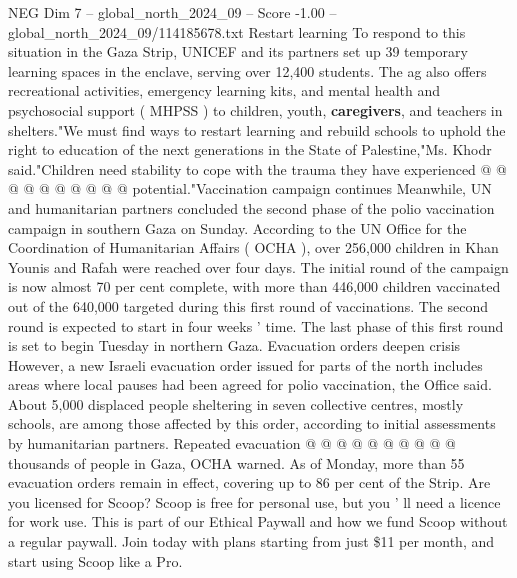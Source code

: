 \begin{textsample}{NEG Dim 7 – global\_north\_2024\_09 – Score -1.00 – global\_north\_2024\_09/114185678.txt}
Restart learning To respond to this situation in the Gaza Strip, UNICEF and its partners set up 39 temporary learning spaces in the enclave, serving over 12,400 students.
The ag also offers recreational activities, emergency learning kits, and mental health and psychosocial support ( MHPSS ) to children, youth, \textbf{caregivers}, and teachers in shelters."We must find ways to restart learning and rebuild schools to uphold the right to education of the next generations in the State of Palestine,"Ms.
Khodr said."Children need stability to cope with the trauma they have experienced @ @ @ @ @ @ @ @ @ @ potential."Vaccination campaign continues Meanwhile, UN and humanitarian partners concluded the second phase of the polio vaccination campaign in southern Gaza on Sunday.
According to the UN Office for the Coordination of Humanitarian Affairs ( OCHA ), over 256,000 children in Khan Younis and Rafah were reached over four days.
The initial round of the campaign is now almost 70 per cent complete, with more than 446,000 children vaccinated out of the 640,000 targeted during this first round of vaccinations.
The second round is expected to start in four weeks ' time.
The last phase of this first round is set to begin Tuesday in northern Gaza.
Evacuation orders deepen crisis However, a new Israeli evacuation order issued for parts of the north includes areas where local pauses had been agreed for polio vaccination, the Office said.
About 5,000 displaced people sheltering in seven collective centres, mostly schools, are among those affected by this order, according to initial assessments by humanitarian partners.
Repeated evacuation @ @ @ @ @ @ @ @ @ @ thousands of people in Gaza, OCHA warned.
As of Monday, more than 55 evacuation orders remain in effect, covering up to 86 per cent of the Strip.
Are you licensed for Scoop?
Scoop is free for personal use, but you ' ll need a licence for work use.
This is part of our Ethical Paywall and how we fund Scoop without a regular paywall.
Join today with plans starting from just \$11 per month, and start using Scoop like a Pro.

\end{textsample}
